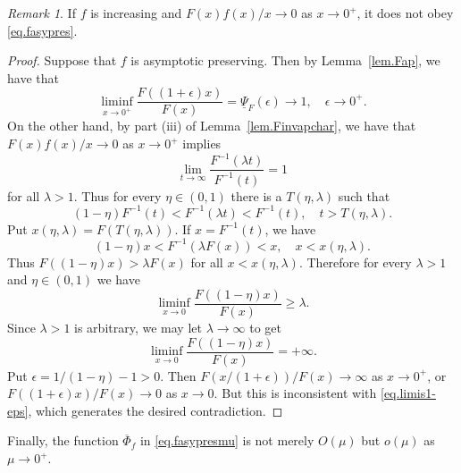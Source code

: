 \documentclass[a4paper,10pt,reqno]{amsart}
\numberwithin{equation}{section}
\theoremstyle{definition}
\theoremstyle{remark}
\newtheorem{remark}{Remark}
\DeclareMathOperator{\1}{\mathbbm 1}
\begin{document}
	\begin{remark}
		If $f$ is increasing and $F(x)f(x)/x\to 0$ as $x\to 0^+$, it does not obey \eqref{eq.fasypres}.
	\end{remark}
	\begin{proof}
		Suppose that $f$ is asymptotic preserving. Then by Lemma~\ref{lem.Fap}, we have that 
		\begin{equation} \label{eq.limis1-eps}
			\liminf_{x\to 0^+} \frac{F((1+\epsilon)x)}{F(x)}=\underline{\Psi}_F(\epsilon)\to 1, \quad \epsilon\to 0^+.
		\end{equation}
		On the other hand, by part (iii) of Lemma~\ref{lem.Finvapchar}, we have that $F(x)f(x)/x\to 0$ as $x\to 0^+$ implies 
		\[
		\lim_{t\to\infty} \frac{F^{-1}(\lambda t)}{F^{-1}(t)}=1
		\]
		for all $\lambda>1$. Thus for every $\eta\in (0,1)$ there is a $T(\eta,\lambda)$ such that 
		\[
		(1-\eta)F^{-1}(t)<F^{-1}(\lambda t)< F^{-1}(t), \quad t>T(\eta,\lambda).
		\] 
		Put $x(\eta,\lambda)=F(T(\eta,\lambda))$. If $x=F^{-1}(t)$, we have
		\[
		(1-\eta) x < F^{-1}(\lambda F(x))< x, \quad x<x(\eta,\lambda).
		\] 
		Thus $F((1-\eta)x)>\lambda F(x)$ for all $ x<x(\eta,\lambda)$. Therefore for every $\lambda>1$ and $\eta\in (0,1)$ we have 
		\[
		\liminf_{x\to 0} \frac{F((1-\eta)x)}{F(x)}\geq \lambda.
		\]
		Since $\lambda>1$ is arbitrary, we may let $\lambda\to \infty$ to get 
		\[
		\liminf_{x\to 0} \frac{F((1-\eta)x)}{F(x)}=+\infty.
		\]
		Put $\epsilon=1/(1-\eta)-1>0$. Then $F(x/(1+\epsilon))/F(x)\to\infty$ as $x\to 0^+$, or  $F((1+\epsilon)x)/F(x)\to 0$ as $x\to 0$. But this is inconsistent with \eqref{eq.limis1-eps}, which generates the desired contradiction.
	\end{proof}	
	
	Finally, the function $\overline{\Phi}_f$ in \eqref{eq.fasypresmu} is not merely $O(\mu)$ but $o(\mu)$ as $\mu\to 0^+$.
	
\end{document}
